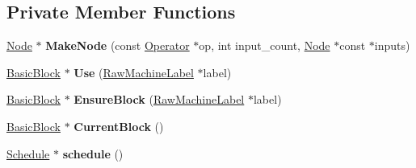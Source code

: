 \subsection*{Private Member Functions}
\begin{DoxyCompactItemize}
\item 
\hyperlink{classv8_1_1internal_1_1compiler_1_1_node}{Node} $\ast$ {\bfseries Make\+Node} (const \hyperlink{classv8_1_1internal_1_1compiler_1_1_operator}{Operator} $\ast$op, int input\+\_\+count, \hyperlink{classv8_1_1internal_1_1compiler_1_1_node}{Node} $\ast$const $\ast$inputs)\hypertarget{classv8_1_1internal_1_1compiler_1_1_raw_machine_assembler_abee80c5d506f5eb52dc7ae0516d4f2b1}{}\label{classv8_1_1internal_1_1compiler_1_1_raw_machine_assembler_abee80c5d506f5eb52dc7ae0516d4f2b1}

\item 
\hyperlink{classv8_1_1internal_1_1compiler_1_1_basic_block}{Basic\+Block} $\ast$ {\bfseries Use} (\hyperlink{classv8_1_1internal_1_1compiler_1_1_raw_machine_label}{Raw\+Machine\+Label} $\ast$label)\hypertarget{classv8_1_1internal_1_1compiler_1_1_raw_machine_assembler_ac4e55b82ea8d5cb0e9b4ab1a2e51e83f}{}\label{classv8_1_1internal_1_1compiler_1_1_raw_machine_assembler_ac4e55b82ea8d5cb0e9b4ab1a2e51e83f}

\item 
\hyperlink{classv8_1_1internal_1_1compiler_1_1_basic_block}{Basic\+Block} $\ast$ {\bfseries Ensure\+Block} (\hyperlink{classv8_1_1internal_1_1compiler_1_1_raw_machine_label}{Raw\+Machine\+Label} $\ast$label)\hypertarget{classv8_1_1internal_1_1compiler_1_1_raw_machine_assembler_ac8a2679608514e7586e8a1218b0cebfd}{}\label{classv8_1_1internal_1_1compiler_1_1_raw_machine_assembler_ac8a2679608514e7586e8a1218b0cebfd}

\item 
\hyperlink{classv8_1_1internal_1_1compiler_1_1_basic_block}{Basic\+Block} $\ast$ {\bfseries Current\+Block} ()\hypertarget{classv8_1_1internal_1_1compiler_1_1_raw_machine_assembler_a27c4fb56d03034c59d46791b549cb012}{}\label{classv8_1_1internal_1_1compiler_1_1_raw_machine_assembler_a27c4fb56d03034c59d46791b549cb012}

\item 
\hyperlink{classv8_1_1internal_1_1compiler_1_1_schedule}{Schedule} $\ast$ {\bfseries schedule} ()\hypertarget{classv8_1_1internal_1_1compiler_1_1_raw_machine_assembler_a31d8f16c6c64c57d3a70d21e780599ed}{}\label{classv8_1_1internal_1_1compiler_1_1_raw_machine_assembler_a31d8f16c6c64c57d3a70d21e780599ed}


\end{DoxyCompactItemize}

